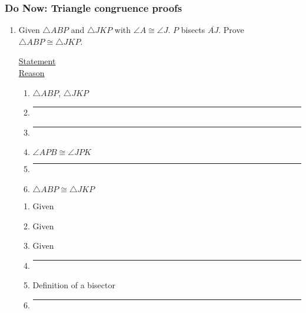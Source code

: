 \documentclass[12pt, twoside]{article}
\begin{document}
\subsubsection*{Do Now: Triangle congruence proofs}
 \begin{enumerate}

\item Given $\triangle ABP$ and $\triangle JKP$ with $\angle A \cong \angle J$. $P$ bisects $\overline{AJ}$. Prove $\triangle ABP \cong \triangle JKP$.\\[0.5cm]

  \begin{multicols}{2}
    \underline{Statement} \\
    \underline{Reason}
  \end{multicols}
  \begin{multicols}{2}
    \raggedcolumns
    \begin{enumerate}[label={\arabic*)}]
      \item $\triangle ABP$, $\triangle JKP$ \vspace{0.3cm}
      \item \rule{4cm}{0.15mm} \vspace{0.3cm}
      \item \rule{4cm}{0.15mm} \vspace{0.3cm}
      \item $\angle APB \cong \angle JPK$  \vspace{0.3cm}
      \item \rule{4cm}{0.15mm} \vspace{0.3cm}
      \item $\triangle ABP \cong \triangle JKP$ \vspace{0.3cm}
    \end{enumerate}
    \begin{enumerate}[label={\arabic*)}]
      \item Given \vspace{0.3cm}
      \item Given \vspace{0.3cm}
      \item Given \vspace{0.3cm}
      \item \rule{4cm}{0.15mm} \vspace{0.3cm}
      \item Definition of a bisector \vspace{0.3cm}
      \item \rule{4cm}{0.15mm} \vspace{0.3cm}
    \end{enumerate}
  \end{multicols}


\end{enumerate}
\end{document}
